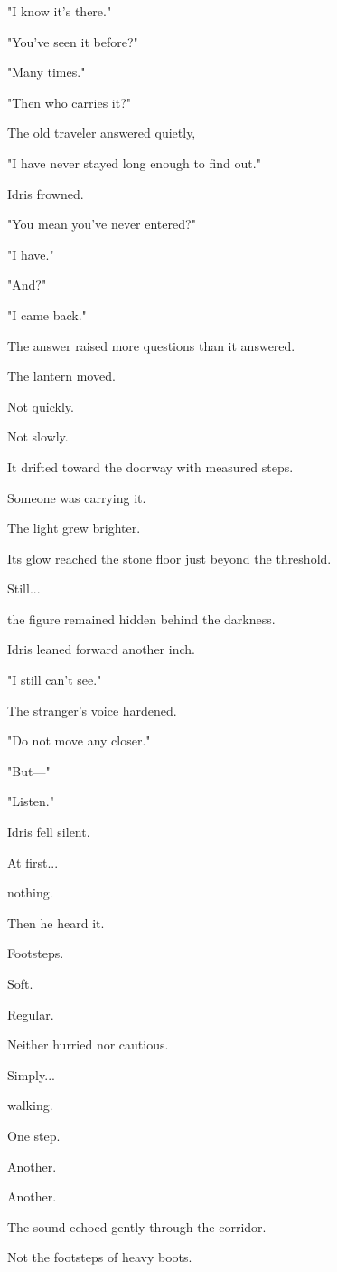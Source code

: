 \documentclass[12pt,openany]{book}
\begin{document}
"I know it's there."

"You've seen it before?"

"Many times."

"Then who carries it?"

The old traveler answered quietly,

"I have never stayed long enough to find out."

Idris frowned.

"You mean you've never entered?"

"I have."

"And?"

"I came back."

The answer raised more questions than it answered.

The lantern moved.

Not quickly.

Not slowly.

It drifted toward the doorway with measured steps.

Someone was carrying it.

The light grew brighter.

Its glow reached the stone floor just beyond the threshold.

Still...

the figure remained hidden behind the darkness.

Idris leaned forward another inch.

"I still can't see."

The stranger's voice hardened.

"Do not move any closer."

"But—"

"Listen."

Idris fell silent.

At first...

nothing.

Then he heard it.

Footsteps.

Soft.

Regular.

Neither hurried nor cautious.

Simply...

walking.

One step.

Another.

Another.

The sound echoed gently through the corridor.

Not the footsteps of heavy boots.
\end{document}
